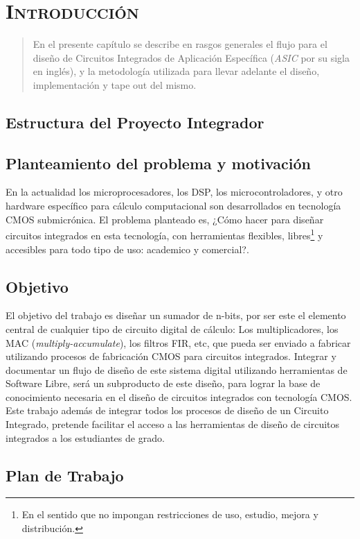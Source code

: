 \chapter{ \textsc{ Introducción } }
\begin{abstract}
En el presente capítulo se describe en rasgos generales el flujo para el diseño de Circuitos Integrados de Aplicación Específica (\emph{ASIC} por su sigla en inglés), y la metodología utilizada para llevar adelante el diseño, implementación y tape out del mismo.
\end{abstract}
\section{Estructura del Proyecto Integrador}

\section{Planteamiento del problema y motivación}
En la actualidad los microprocesadores, los DSP, los microcontroladores, y otro hardware específico para cálculo computacional son desarrollados en tecnología CMOS submicrónica. El problema planteado es, ¿Cómo hacer para diseñar circuitos integrados en esta tecnología, con herramientas flexibles, libres\footnote{En el sentido que no impongan restricciones de uso, estudio, mejora y distribución.} y accesibles para todo tipo de uso: academico y comercial?.

\section{Objetivo}

El objetivo del trabajo es diseñar un sumador de n-bits, por ser este el elemento central de cualquier tipo de circuito digital de cálculo: Los multiplicadores, los MAC (\emph{multiply-accumulate}), los filtros FIR, etc, que pueda ser enviado a fabricar utilizando
procesos de fabricación CMOS para circuitos integrados. Integrar y documentar un flujo de diseño
de este sistema digital utilizando herramientas de Software Libre, será un subproducto de este
diseño, para lograr la base de conocimiento necesaria en el diseño de circuitos integrados con
tecnología CMOS. Este trabajo además de integrar todos los procesos de diseño de un Circuito
Integrado, pretende facilitar el acceso a las herramientas de diseño de circuitos integrados a los estudiantes de grado.
\section{Plan de Trabajo}

